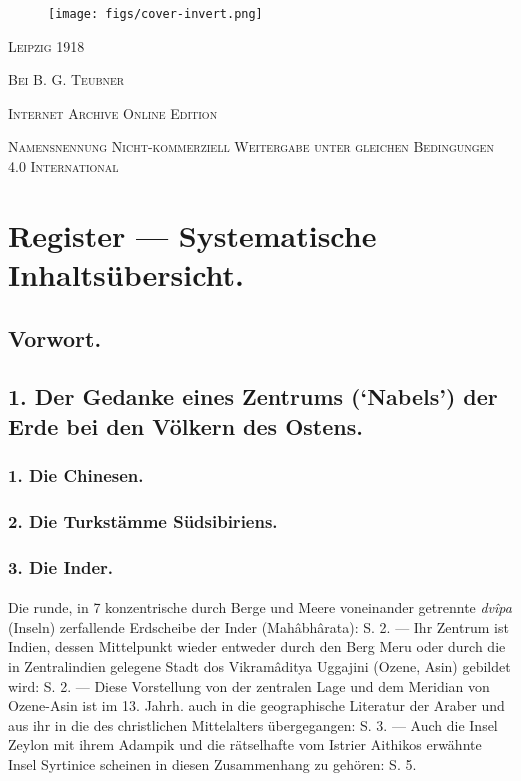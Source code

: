 \documentclass[a4paper, 11pt, oneside]{article}
\begin{document}
\begin{titlepage}

        \begin{figure}[H]
        \centering
        \texttt{[image: figs/cover-invert.png]}
        \end{figure}

	\vspace{0.25\baselineskip}

	{\small\scshape Leipzig 1918}
	
	{\small\scshape{Bei B. G. Teubner}}
 
	\vspace{0.5\baselineskip} %

        \scshape Internet Archive Online Edition  %
	
	{\scshape\small Namensnennung Nicht-kommerziell Weitergabe unter gleichen Bedingungen 4.0 International} %
\end{titlepage}
\setlength{\parskip}{1mm plus1mm minus1mm}
\clearpage
\Large
\tableofcontents
\clearpage
\section*{Register --- Systematische Inhaltsübersicht.}
\subsection*{Vorwort.}
\subsection*{1. Der Gedanke eines Zentrums (`Nabels') der Erde bei den Völkern des Ostens.}
\subsubsection*{1. Die Chinesen.}
\subsubsection*{2. Die Turkstämme Südsibiriens.}
\subsubsection*{3. Die Inder.}
\paragraph{}
Die runde, in 7 konzentrische durch Berge und Meere voneinander getrennte \emph{dvîpa} (Inseln) zerfallende Erdscheibe der Inder (Mahâbhârata): S. 2. --- Ihr Zentrum ist Indien, dessen Mittelpunkt wieder entweder durch den Berg Meru oder durch die in Zentralindien gelegene Stadt dos Vikramâditya Uggajini (Ozene, Asin) gebildet wird: S. 2. --- Diese Vorstellung von der zentralen Lage und dem Meridian von Ozene-Asin ist im 13. Jahrh. auch in die geographische Literatur der Araber und aus ihr in die des christlichen Mittelalters übergegangen: S. 3. --- Auch die Insel Zeylon mit ihrem Adampik und die rätselhafte vom Istrier Aithikos erwähnte Insel Syrtinice scheinen in diesen Zusammenhang zu gehören: S. 5.
\end{document}
